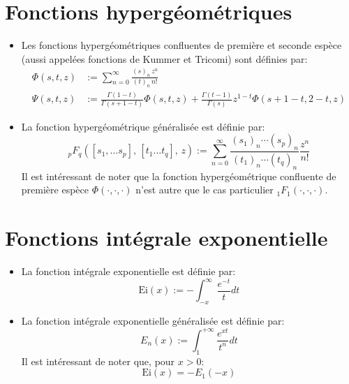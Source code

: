 \section*{Fonctions hypergéométriques}
\begin{itemize}
    \item Les fonctions hypergéométriques confluentes de première et seconde espèce (aussi appelées fonctions de Kummer et Tricomi) sont définies par:
    \[
        \begin{aligned}
            \Phi(s, t, z) &:= \sum_{n=0}^{\infty} \frac{{(s)}_n \, z^n}{{(t)}_n \, n!}  \\
            \Psi(s,t,z) &:= \frac{\Gamma(1-t)}{\Gamma(s+1-t)}\Phi(s,t,z)+\frac{\Gamma(t-1)}{\Gamma(s)}z^{1-t}\Phi(s+1-t,2-t,z)
        \end{aligned}
    \]
    \item La fonction hypergéométrique généralisée est définie par:
    \[
    _p F_q\left([s_1,\dots s_p],\,[t_1\dots t_q],\,z\right):=\sum_{n=0}^\infty\frac{{(s_1)}_n\cdots{(s_p)}_n}{{(t_1)}_n\cdots {(t_q)}_n}\frac{z^n}{n!}
    \]
    Il est intéressant de noter que la fonction hypergéométrique confluente de première espèce $\Phi(\cdot,\cdot,\cdot)$ n'est autre que le cas particulier $_1F_1(\cdot,\cdot,\cdot)$.
\end{itemize}

\section*{Fonctions intégrale exponentielle}
\begin{itemize}
    \item La fonction intégrale exponentielle est définie par:
    \[
    \text{Ei}(x):=-\int^{\infty}_{-x}\frac{e^{-t}}{t}dt
    \]
    \item La fonction intégrale exponentielle généralisée est définie par:
    \[
    E_n(x):=\int_1^{+\infty}\frac{e^{xt}}{t^n}dt
    \]
    Il est intéressant de noter que, pour $x>0$:
    \[\text{Ei}(x)=-E_1(-x)\]
\end{itemize}

